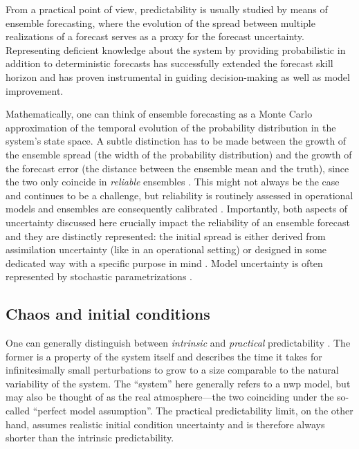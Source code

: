From a practical point of view, predictability is usually studied
by means of ensemble forecasting, where the evolution of the spread between
multiple realizations of a forecast serves as a proxy for the forecast
uncertainty. Representing deficient knowledge about the system by providing
probabilistic in addition to deterministic forecasts has successfully extended
the forecast skill horizon \parencite{buizzaForecastSkillHorizon2015} and has
proven instrumental in guiding decision-making as well as model improvement.

Mathematically, one can think of ensemble forecasting as a Monte Carlo
approximation of the temporal evolution of the probability distribution in the
system's state space. A subtle distinction has to be made between the growth of
the ensemble spread (the width of the probability distribution) and the growth
of the forecast error (the distance between the ensemble mean and the truth),
since the two only coincide in \emph{reliable} ensembles
\parencite{leutbecherEnsembleForecasting2008}. This might not always be the
case and continues to be a challenge, but reliability is routinely assessed in
operational models and ensembles are consequently calibrated
\parencite{rodwellReliabilityEnsembleData2016}.
Importantly, both aspects of uncertainty discussed here crucially impact the
reliability of an ensemble forecast and they are distinctly represented: the
initial spread is either derived from
assimilation uncertainty (like in an operational setting) or designed in some
dedicated way with a specific purpose in mind
\parencite[ch.~6]{kalnayEarthSystemModeling2024}. Model uncertainty is often
represented by stochastic parametrizations
\parencite{palmerStochasticWeatherClimate2019,
    christensenParametrizationWeatherClimate2022}.

\subsection{Chaos and initial conditions}
\label{sec:intro_predictability_chaos}

One can generally distinguish between \emph{intrinsic} and \emph{practical}
predictability \parencite{sunIntrinsicPracticalLimits2016,
    selzTransitionPracticalIntrinsic2022}. The former is a property of the system
itself and describes the time it takes for infinitesimally small perturbations
to grow to a size comparable to the natural variability of the system. The
\enquote{system} here generally refers to a
\gls{nwp} model, but may also be thought of as the
real atmosphere---the two coinciding under the so-called
\enquote{perfect model assumption}. The practical predictability limit, on
the other hand, assumes realistic initial condition uncertainty and is
therefore always shorter than the intrinsic predictability.

